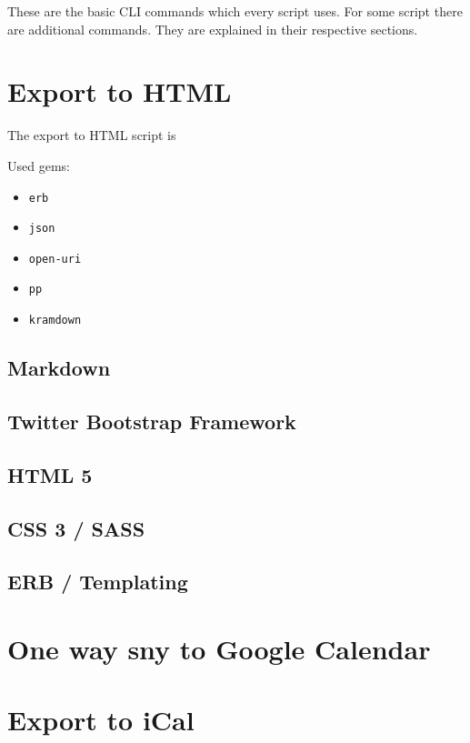 These are the basic CLI commands which every script uses. For some script there are additional commands. They are explained in their respective sections.

\section{Export to HTML}
The export to HTML script is 

Used gems:
\begin{itemize}
	\item \texttt{erb}
	\item \texttt{json}
	\item \texttt{open-uri}
	\item \texttt{pp}
	\item \texttt{kramdown}
\end{itemize}


\subsection{Markdown}

\subsection{Twitter Bootstrap Framework}

\subsection{HTML 5}

\subsection{CSS 3 / SASS}

\subsection{ERB / Templating}

\section{One way sny to Google Calendar}

\section{Export to iCal}

